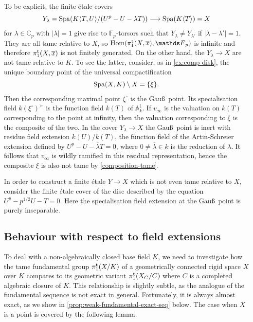 \begin{ex}
    To be explicit, the finite \'etale covers
    \[ 
        Y_\lambda = \operatorname{Spa}(K\langle T, U\rangle/(U^p-U-\lambda T)) \longrightarrow \operatorname{Spa}(K\langle T\rangle) = X
    \]
    for $\lambda\in\mathbb{C}_p$ with $|\lambda|=1$ give rise to $\mathbb{F}_p$-torsors such that $Y_\lambda\neq Y_{\lambda'}$ if $|\lambda-\lambda'|=1$. They are all tame relative to $X$, so $\Hom(\pitame(X,\overline{x}),\bF_p)$ is infinite and therefore $\pi_1^{\mathrm{t}}(X,\overline{x})$ is not finitely generated. On the other hand, the $Y_\lambda \to X$ are not tame relative to $K$.  
    To see the latter, consider, as in \cref{ex:comp-disk}, the unique boundary point of the universal compactification 
    \[
        \operatorname{Spa}(X,K)\setminus X = \{\xi\}.
    \]
    Then the corresponding maximal point $\xi^\circ$ is the Gau\ss\ point. Its specialisation field $k(\xi^\circ)^\succ$ is the function field $k(T)$ of $\mathbb{A}^1_k$. If $v_\infty$ is the valuation on $k(T)$ corresponding to the point at infinity, then the valuation corresponding to $\xi$ is the composite of the two. In the cover $Y_\lambda \to X$ the Gau\ss\ point is inert with residue field extension $k(U)/k(T)$, the function field of the Artin-Schreier extension defined by $U^p-U - \bar \lambda T = 0$, where $0 \not=\bar \lambda \in k$ is the reduction of $\lambda$. It follows that $v_\infty$ is wildly ramified in this residual representation, hence the composite $\xi$ is also not tame by \cref{composition-tame}.

    In order to construct a finite \'etale $Y\to X$ which is not even tame relative to $X$, consider the finite \'etale cover of the disc described by the equation $U^p - p^{1/2}U  - T = 0$. Here the specialisation field extension at the Gau\ss\ point is purely inseparable.    
\end{ex}

\subsection{Behaviour with respect to field extensions} 
\label{ss:K-vs-C}

To deal with a non-algebraically closed base field $K$, we need to investigate how the tame fundamental group $\pi_1^{\mathrm{t}}(X/K)$ of a geometrically connected rigid space $X$ over $K$ compares to its geometric variant $\pi_1^{\mathrm{t}}(X_C/C)$ where $C$ is a completed algebraic closure of $K$. This relationship is slightly subtle, as the analogue of the fundamental sequence is not exact in general. Fortunately, it is always almost exact, as we show in \cref{prop:weak-fundamental-exact-seq} below. The case when $X$ is a point is covered by the following lemma. 


